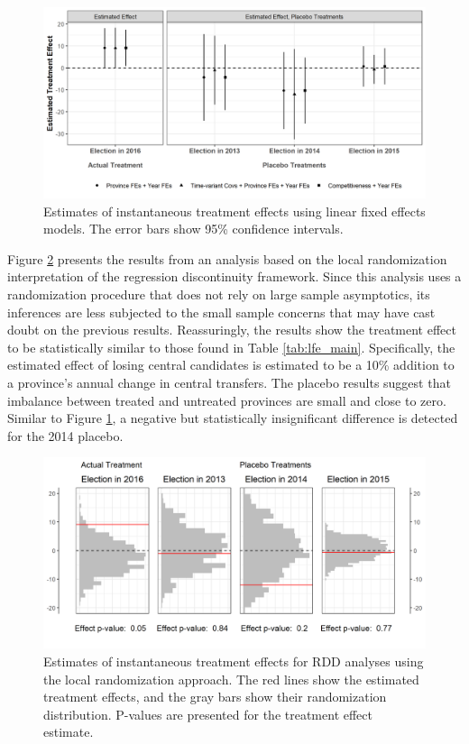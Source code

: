 \documentclass[12pt]{article}
\newcommand{\1}{\mathbbm{1}}
\begin{document}
\begin{figure}[!htbp]
	\centering
	\includegraphics[width=\textwidth]{figure/200205_lfe_placebo.png}
	\captionsetup{singlelinecheck=off}
	\caption[Estimated placebo linear fixed effects treatment effects]{Estimates of instantaneous treatment effects using linear fixed effects models. The error bars show 95\% confidence intervals.}
	\label{fig:lfe_placebo}
\end{figure}

Figure \ref{fig:rdd_placebo} presents the results from an analysis based on the local randomization interpretation of the regression discontinuity framework. Since this analysis uses a randomization procedure that does not rely on large sample asymptotics, its inferences are less subjected to the small sample concerns that may have cast doubt on the previous results. Reassuringly, the results show the treatment effect to be statistically similar to those found in Table \ref{tab:lfe_main}. Specifically, the estimated effect of losing central candidates is estimated to be a 10\% addition to a province's annual change in central transfers. The placebo results suggest that imbalance between treated and untreated provinces are small and close to zero. Similar to Figure \ref{fig:lfe_placebo}, a negative but statistically insignificant difference is detected for the 2014 placebo. 

\begin{figure}[!htbp]
	\centering
	\includegraphics[width=\textwidth]{figure/200205_rdd_results.png}
	\captionsetup{singlelinecheck=off}
	\caption[Estimated RDD treatment effects]{Estimates of instantaneous treatment effects for RDD analyses using the local randomization approach. The red lines show the estimated treatment effects, and the gray bars show their randomization distribution. P-values are presented for the treatment effect estimate.}
	\label{fig:rdd_placebo}
\end{figure}
\end{document}
